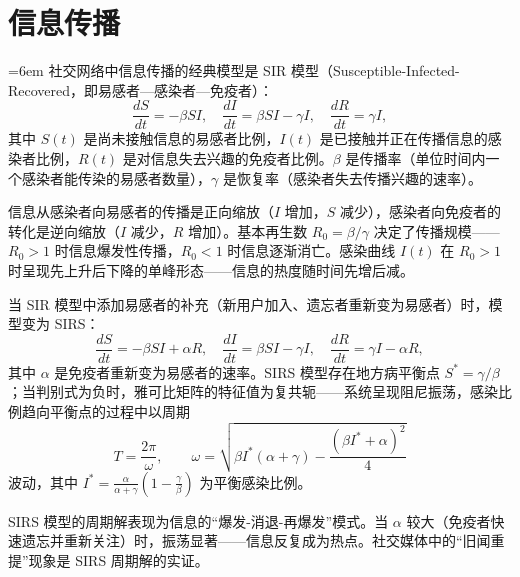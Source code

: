\section{信息传播}

\begin{definition}\label{def:sir_model}
\emergencystretch=6em
社交网络中信息传播的经典模型是 SIR 模型（Susceptible-Infected-Recovered，即易感者—感染者—免疫者）：
\[
\frac{dS}{dt} = -\beta S I, \quad \frac{dI}{dt} = \beta S I - \gamma I, \quad \frac{dR}{dt} = \gamma I,
\]
其中 $S(t)$ 是尚未接触信息的易感者比例，$I(t)$ 是已接触并正在传播信息的感染者比例，$R(t)$ 是对信息失去兴趣的免疫者比例。$\beta$ 是传播率（单位时间内一个感染者能传染的易感者数量），$\gamma$ 是恢复率（感染者失去传播兴趣的速率）。

信息从感染者向易感者的传播是正向缩放（$I$ 增加，$S$ 减少），感染者向免疫者的转化是逆向缩放（$I$ 减少，$R$ 增加）。基本再生数 $R_0 = \beta/\gamma$ 决定了传播规模——$R_0 > 1$ 时信息爆发性传播，$R_0 < 1$ 时信息逐渐消亡。感染曲线 $I(t)$ 在 $R_0 > 1$ 时呈现先上升后下降的单峰形态——信息的热度随时间先增后减。
\end{definition}

\begin{proposition}\label{prop:sir_periodic}
当 SIR 模型中添加易感者的补充（新用户加入、遗忘者重新变为易感者）时，模型变为 SIRS：
\[
\frac{dS}{dt} = -\beta S I + \alpha R, \quad \frac{dI}{dt} = \beta S I - \gamma I, \quad \frac{dR}{dt} = \gamma I - \alpha R,
\]
其中 $\alpha$ 是免疫者重新变为易感者的速率。SIRS 模型存在地方病平衡点 $S^* = \gamma/\beta$；当判别式为负时，雅可比矩阵的特征值为复共轭——系统呈现阻尼振荡，感染比例趋向平衡点的过程中以周期
\[
T = \frac{2\pi}{\omega}, \qquad \omega = \sqrt{\beta I^*(\alpha+\gamma) - \frac{(\beta I^*+\alpha)^2}{4}}
\]
波动，其中 $I^* = \frac{\alpha}{\alpha+\gamma}\left(1-\frac{\gamma}{\beta}\right)$ 为平衡感染比例。

SIRS 模型的周期解表现为信息的“爆发-消退-再爆发”模式。当 $\alpha$ 较大（免疫者快速遗忘并重新关注）时，振荡显著——信息反复成为热点。社交媒体中的“旧闻重提”现象是 SIRS 周期解的实证。
\end{proposition}


